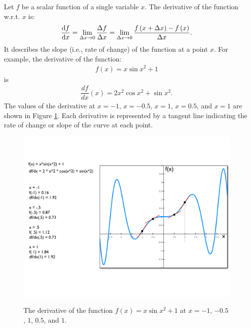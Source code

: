 \documentclass[12pt,letter]{article}
\begin{document}
Let $f$ be a scalar function of a single variable $x$. The derivative of the function w.r.t. $x$ is: 
\begin{align}
        \dv{f}{x} = \lim_{\Delta x \rightarrow 0}\frac{\Delta f}{\Delta x} = \lim_{\Delta x \rightarrow 0}\frac{f\left(x+\Delta x\right) - f\left(x\right)}{\Delta x}.
	\label{dfx}
\end{align}	
It describes the slope (i.e., rate of change) of the function at a point $x$. For example, the derivative of the function:
\begin{align} 
f(x) = x\sin x^2 + 1
\end{align} 
is 
\begin{align} 
\dfrac{df}{dx}\left(x\right) = 2x^2\cos x^2 + \sin x^2. 
\end{align} 
The values of the derivative at $x=-1$, $x=-0.5$, $x=1$, $x=0.5$, and $x=1$ are shown in Figure \ref{fig_dfdx}. Each derivative is represented by a tangent line indicating the rate of change or slope of the curve at each point. 
\begin{figure}[ht]
	\begin{center}
		{\includegraphics[width=.70\textwidth]{figs/derivative.pdf}}
	\end{center}
	\caption{The derivative of the function $f(x) = x\sin x^2 + 1$ at $x=-1$, $-0.5$, $1$, $0.5$, and $1$. }
	\label{fig_dfdx}
\end{figure}
\end{document}
